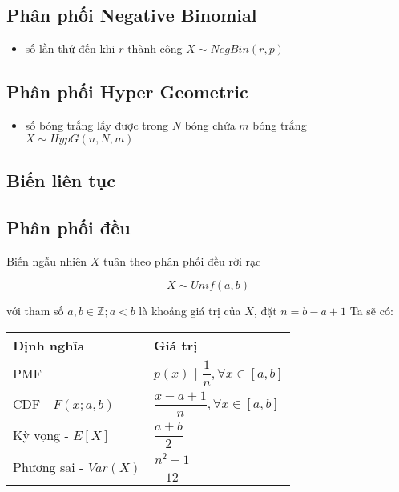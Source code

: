 \subsection{Phân phối Negative Binomial}

\begin{itemize}
  \item số lần thử đến khi $r$ thành công $X \sim NegBin(r,p)$
\end{itemize}

\subsection{Phân phối Hyper Geometric}

\begin{itemize}
  \item số bóng trắng lấy được trong $N$ bóng chứa $m$ bóng trắng  $X \sim HypG(n, N, m)$
\end{itemize}

\subsection{Biến liên tục}

\subsection{Phân phối đều}


\newline

Biến ngẫu nhiên $X$ tuân theo phân phối đều rời rạc

$$X \sim Unif (a, b)$$

với tham số $a, b \in \mathbb Z; a < b$ là khoảng giá trị của $X$, đặt $n = b-a+1$
\newline
Ta sẽ có:
\newline
\begin{tabular}[c]{ | l | l | }
  \hline
  Định nghĩa & Giá trị \\
  \hline
  PMF & $p(x)$ | $\dfrac{1}{n}, \forall x \in [a,b]$ \\
  \hline
  CDF - $F(x;a,b)$ & $\dfrac{x-a+1}{n}, \forall x \in [a,b]$ \\
  \hline
  Kỳ vọng - $E[X]$ & $\dfrac{a+b}{2}$ \\
  \hline
  Phương sai - $Var(X)$ & $\dfrac{n^2-1}{12}$ \\
  \hline
\end{tabular}


